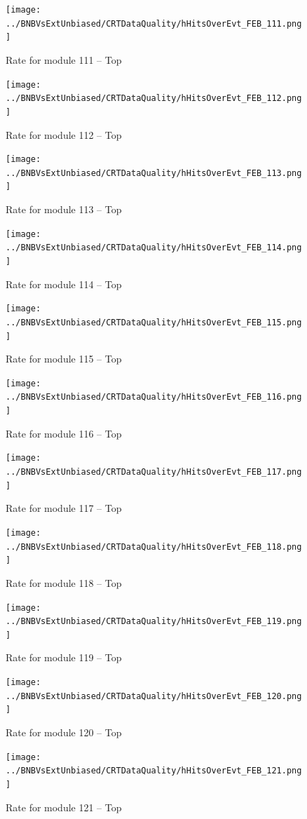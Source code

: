 \begin{figure}[h!]
\centering
\texttt{[image: ../BNBVsExtUnbiased/CRTDataQuality/hHitsOverEvt\_FEB\_111.png]}
\caption{Rate for module 111 -- Top}
\label{Annual111}
\end{figure}
\begin{figure}[h!]
\centering
\texttt{[image: ../BNBVsExtUnbiased/CRTDataQuality/hHitsOverEvt\_FEB\_112.png]}
\caption{Rate for module 112 -- Top}
\label{Annual112}
\end{figure}
\begin{figure}[h!]
\centering
\texttt{[image: ../BNBVsExtUnbiased/CRTDataQuality/hHitsOverEvt\_FEB\_113.png]}
\caption{Rate for module 113 -- Top}
\label{Annual113}
\end{figure}
\begin{figure}[h!]
\centering
\texttt{[image: ../BNBVsExtUnbiased/CRTDataQuality/hHitsOverEvt\_FEB\_114.png]}
\caption{Rate for module 114 -- Top}
\label{Annual114}
\end{figure}
\begin{figure}[h!]
\centering
\texttt{[image: ../BNBVsExtUnbiased/CRTDataQuality/hHitsOverEvt\_FEB\_115.png]}
\caption{Rate for module 115 -- Top}
\label{Annual115}
\end{figure}
\begin{figure}[h!]
\centering
\texttt{[image: ../BNBVsExtUnbiased/CRTDataQuality/hHitsOverEvt\_FEB\_116.png]}
\caption{Rate for module 116 -- Top}
\label{Annual116}
\end{figure}
\begin{figure}[h!]
\centering
\texttt{[image: ../BNBVsExtUnbiased/CRTDataQuality/hHitsOverEvt\_FEB\_117.png]}
\caption{Rate for module 117 -- Top}
\label{Annual117}
\end{figure}
\begin{figure}[h!]
\centering
\texttt{[image: ../BNBVsExtUnbiased/CRTDataQuality/hHitsOverEvt\_FEB\_118.png]}
\caption{Rate for module 118 -- Top}
\label{Annual118}
\end{figure}
\begin{figure}[h!]
\centering
\texttt{[image: ../BNBVsExtUnbiased/CRTDataQuality/hHitsOverEvt\_FEB\_119.png]}
\caption{Rate for module 119 -- Top}
\label{Annual119}
\end{figure}
\begin{figure}[h!]
\centering
\texttt{[image: ../BNBVsExtUnbiased/CRTDataQuality/hHitsOverEvt\_FEB\_120.png]}
\caption{Rate for module 120 -- Top}
\label{Annual120}
\end{figure}
\begin{figure}[h!]
\centering
\texttt{[image: ../BNBVsExtUnbiased/CRTDataQuality/hHitsOverEvt\_FEB\_121.png]}
\caption{Rate for module 121 -- Top}
\label{Annual121}
\end{figure}
